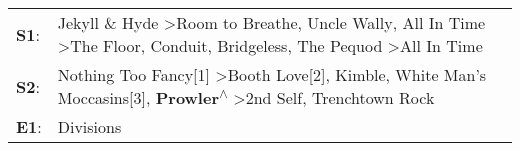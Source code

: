 \begin{supertabular}{p{0.03\textwidth}p{0.92\textwidth}}
 \textbf{S1}:  &  Jekyll \& Hyde\textsuperscript{} \textgreater \enspace Room to Breathe\textsuperscript{}, \enspace Uncle Wally\textsuperscript{}, \enspace All In Time\textsuperscript{} \textgreater \enspace The Floor\textsuperscript{}, \enspace Conduit\textsuperscript{}, \enspace Bridgeless\textsuperscript{}, \enspace The Pequod\textsuperscript{} \textgreater \enspace All In Time\textsuperscript{}  \enspace  \\
 \textbf{S2}:  &                                                            Nothing Too Fancy[1]\textsuperscript{} \textgreater \enspace Booth Love[2]\textsuperscript{}, \enspace Kimble\textsuperscript{}, \enspace White Man's Moccasins[3]\textsuperscript{}, \enspace \textbf{Prowler\textsuperscript{$\wedge$}} \textgreater \enspace 2nd Self\textsuperscript{}, \enspace Trenchtown Rock\textsuperscript{}  \enspace  \\
 \textbf{E1}:  &                                                                                                                                                                                                                                                                                                                                                                       Divisions\textsuperscript{}  \enspace  \\
\end{supertabular}
